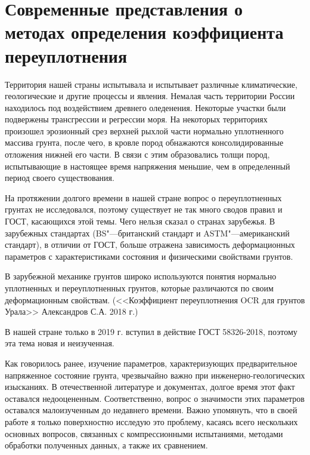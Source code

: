 \chapter{Современные представления о методах определения коэффициента переуплотнения}

Территория нашей страны испытывала и испытывает различные климатические, геологические и другие процессы и явления. Немалая часть территории России находилось под воздействием древнего оледенения. Некоторые участки были подвержены трансгрессии и регрессии моря. На некоторых территориях произошел эрозионный срез верхней рыхлой части нормально уплотненного массива грунта, после чего, в кровле пород обнажаются консолидированные отложения нижней его части. В связи с этим образовались толщи пород, испытывающие в настоящее время напряжения меньшие, чем в определенный период своего существования.

На протяжении долгого времени в нашей стране вопрос о переуплотненных грунтах не исследовался, поэтому существует не так много сводов правил и ГОСТ, касающихся этой темы. Чего нельзя сказал о странах зарубежья. 
В зарубежных стандартах (BS"---британский стандарт и ASTM"---американский стандарт), в отличии от ГОСТ, больше отражена зависимость деформационных параметров с характеристиками состояния и физическими свойствами грунтов.


В зарубежной механике грунтов широко используются понятия нормально уплотненных и переуплотненных грунтов, которые различаются по своим деформационным свойствам. (<<Коэффициент переуплотнения OCR  для грунтов Урала>> Александров С.А. 2018 г.) \cite{Aleksandrov_2018}

В нашей стране только в 2019 г. вступил в действие ГОСТ 58326-2018, поэтому эта тема новая и неизученная.

Как говорилось ранее, изучение параметров, характеризующих предварительное напряженное состояние грунта, чрезвычайно важно при инженерно-геологических изысканиях. В отечественной литературе и документах, долгое время этот факт оставался недооцененным. Соответственно, вопрос о значимости этих параметров оставался малоизученным до недавнего времени. Важно упомянуть, что в своей работе я только поверхностно исследую это проблему,  касаясь всего нескольких основных вопросов, связанных с компрессионными испытаниями, методами обработки полученных данных, а также их сравнением.


